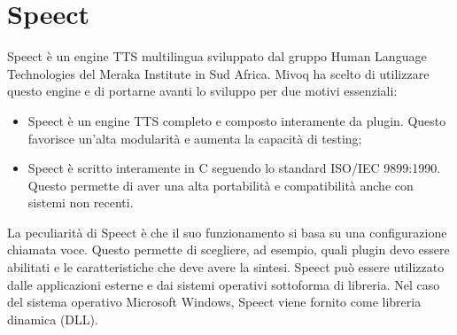 \section{Speect}
Speect è un engine TTS multilingua sviluppato dal gruppo Human Language Technologies del Meraka Institute in Sud Africa. 
Mivoq ha scelto di utilizzare questo engine e di portarne avanti lo sviluppo per due motivi essenziali:
\begin{itemize}
	\item Speect è un engine TTS completo e composto interamente da plugin. Questo favorisce un'alta modularità e aumenta la capacità di testing;
	\item Speect è scritto interamente in C seguendo lo standard ISO/IEC 9899:1990. Questo permette di aver una alta portabilità e compatibilità anche con sistemi non recenti. 
\end{itemize}
La peculiarità di Speect è che il suo funzionamento si basa su una configurazione chiamata voce. Questo permette di scegliere, ad esempio, quali plugin devo essere abilitati e le caratteristiche che deve avere la sintesi.
Speect può essere utilizzato dalle applicazioni esterne e dai sistemi operativi sottoforma di libreria. Nel caso del sistema operativo Microsoft Windows, Speect viene fornito come libreria dinamica (DLL).
